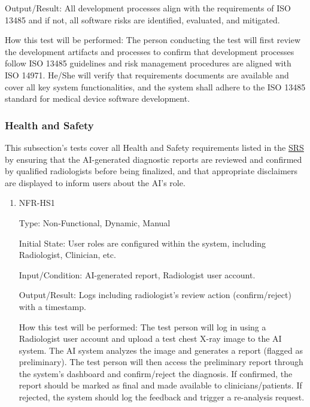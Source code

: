 \documentclass[12pt, titlepage]{article}
\begin{document}
\begin{enumerate}
\begin{enumerate}
\begin{enumerate}
\begin{enumerate}
Output/Result: All development processes align with the requirements of ISO 13485 and if not, all software risks are identified, evaluated, and mitigated.

How this test will be performed: The person conducting the test will first review the development artifacts and processes to confirm that development processes follow ISO 13485 guidelines and risk management procedures are aligned with ISO 14971. He/She will verify that requirements documents are available and cover all key system functionalities, and the system shall adhere to the ISO 13485 standard for medical device software development.

\end{enumerate}

\subsubsection{Health and Safety}

This subsection's tests cover all Health and Safety requirements listed in the \href{https://github.com/RezaJodeiri/CXR-Capstone/blob/main/docs/SRS/SRS.pdf}{SRS} \citep{SRS}
 by ensuring that the AI-generated diagnostic reports are reviewed and confirmed by qualified radiologists before being finalized, and that appropriate disclaimers are displayed to inform users about the AI's role.

\begin{enumerate}

\item{NFR-HS1\\}\label{NFR-HS1}

Type: Non-Functional, Dynamic, Manual

Initial State: User roles are configured within the system, including Radiologist, Clinician, etc.

Input/Condition: AI-generated report, Radiologist user account.

Output/Result: Logs including radiologist’s review action (confirm/reject) with a timestamp.

How this test will be performed: The test person will log in using a Radiologist user account and upload a test chest X-ray image to the AI system. The AI system analyzes the image and generates a report (flagged as preliminary). The test person will then access the preliminary report through the system’s dashboard and confirm/reject the diagnosis. If confirmed, the report should be marked as final and made available to clinicians/patients. If rejected, the system should log the feedback and trigger a re-analysis request.


\end{enumerate}
\end{enumerate}
\end{enumerate}
\end{enumerate}
\end{document}
